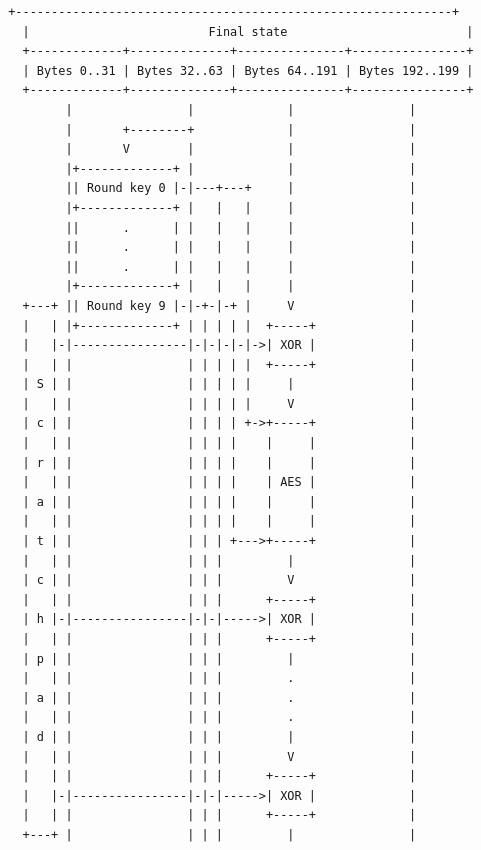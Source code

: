 \documentclass[
]{article}
\begin{document}
\begin{verbatim}
 +-------------------------------------------------------------+
   |                         Final state                         |
   +-------------+--------------+---------------+----------------+
   | Bytes 0..31 | Bytes 32..63 | Bytes 64..191 | Bytes 192..199 |
   +-------------+--------------+---------------+----------------+
         |                |             |                |
         |       +--------+             |                |
         |       V        |             |                |
         |+-------------+ |             |                |
         || Round key 0 |-|---+---+     |                |
         |+-------------+ |   |   |     |                |
         ||      .      | |   |   |     |                |
         ||      .      | |   |   |     |                |
         ||      .      | |   |   |     |                |
         |+-------------+ |   |   |     |                |
   +---+ || Round key 9 |-|-+-|-+ |     V                |
   |   | |+-------------+ | | | | |  +-----+             |
   |   |-|----------------|-|-|-|-|->| XOR |             |
   |   | |                | | | | |  +-----+             |
   | S | |                | | | | |     |                |
   |   | |                | | | | |     V                |
   | c | |                | | | | +->+-----+             |
   |   | |                | | | |    |     |             |
   | r | |                | | | |    |     |             |
   |   | |                | | | |    | AES |             |
   | a | |                | | | |    |     |             |
   |   | |                | | | |    |     |             |
   | t | |                | | | +--->+-----+             |
   |   | |                | | |         |                |
   | c | |                | | |         V                |
   |   | |                | | |      +-----+             |
   | h |-|----------------|-|-|----->| XOR |             |
   |   | |                | | |      +-----+             |
   | p | |                | | |         |                |
   |   | |                | | |         .                |
   | a | |                | | |         .                |
   |   | |                | | |         .                |
   | d | |                | | |         |                |
   |   | |                | | |         V                |
   |   | |                | | |      +-----+             |
   |   |-|----------------|-|-|----->| XOR |             |
   |   | |                | | |      +-----+             |
   +---+ |                | | |         |                |

\end{verbatim}
\end{document}
